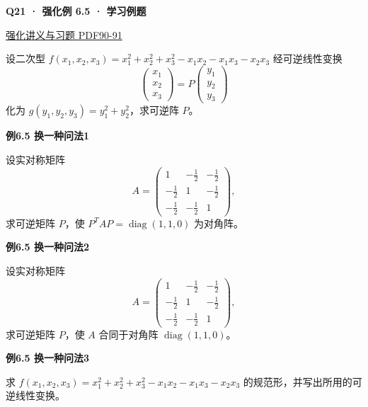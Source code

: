 \documentclass[UTF8,fontset=fandol,11pt,a4paper]{ctexart}
\newcommand{\source}[1]{{\footnotesize\color{Muted}#1\par}}
\newcommand{\qtitle}[2]{\par\needspace{5\baselineskip}\hypertarget{#1}{}\label{#1}\textbf{#2}\par}
\begin{document}
\begin{minipage}{\linewidth}
\qtitle{R-EX-05}{Q21 · 强化例 6.5 · 学习例题}
\source{\href{file:///Users/skyintelligence/Desktop/\%E5\%BE\%97\%E8\%AF\%BB\%E4\%B8\%AA\%E7\%A0\%94-\%E5\%8C\%97\%E5\%A4\%A7\%E8\%BD\%AF\%E5\%BE\%AE/\%E6\%95\%B0\%E5\%AD\%A6\%20150/Kira\%C2\%B727\%E7\%BA\%BF\%E6\%80\%A7\%E4\%BB\%A3\%E6\%95\%B0\%E5\%BC\%BA\%E5\%8C\%96\%E8\%AE\%B2\%E4\%B9\%89\%2B\%E4\%B9\%A0\%E9\%A2\%98.pdf\#page=90}{强化讲义与习题 PDF90-91}}
设二次型 $f(x_1,x_2,x_3)=x_1^2+x_2^2+x_3^2-x_1x_2-x_1x_3-x_2x_3$ 经可逆线性变换
\[\begin{pmatrix}x_1\\x_2\\x_3\end{pmatrix}=P\begin{pmatrix}y_1\\y_2\\y_3\end{pmatrix}\]
化为 $g(y_1,y_2,y_3)=y_1^2+y_2^2$，求可逆阵 $P$。
\par\textbf{例6.5 换一种问法1}\par
设实对称矩阵
\[A=\begin{pmatrix}1&-\frac12&-\frac12\\-\frac12&1&-\frac12\\-\frac12&-\frac12&1\end{pmatrix},\]
求可逆矩阵 $P$，使 $P^TAP=\operatorname{diag}(1,1,0)$ 为对角阵。
\par\textbf{例6.5 换一种问法2}\par
设实对称矩阵
\[A=\begin{pmatrix}1&-\frac12&-\frac12\\-\frac12&1&-\frac12\\-\frac12&-\frac12&1\end{pmatrix},\]
求可逆矩阵 $P$，使 $A$ 合同于对角阵 $\operatorname{diag}(1,1,0)$。
\par\textbf{例6.5 换一种问法3}\par
求 $f(x_1,x_2,x_3)=x_1^2+x_2^2+x_3^2-x_1x_2-x_1x_3-x_2x_3$ 的规范形，并写出所用的可逆线性变换。
\end{minipage}\par\vspace{7mm}
\end{document}
